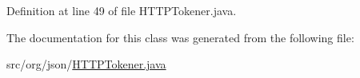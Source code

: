 Definition at line 49 of file H\-T\-T\-P\-Tokener.\-java.



The documentation for this class was generated from the following file\-:\begin{DoxyCompactItemize}
\item 
src/org/json/\hyperlink{HTTPTokener_8java}{H\-T\-T\-P\-Tokener.\-java}\end{DoxyCompactItemize}
